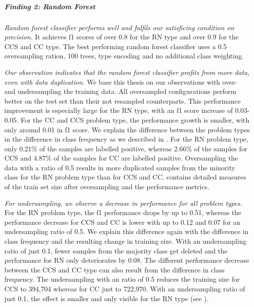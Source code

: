 \subparagraph{Finding 2: Random Forest}
\textit{Random forest classifier performs well and fulfils our satisficing condition on precision.} It achieves f1 scores of over 0.8 for the RN type and over 0.9 for the CCS and CC type.
The best performing random forest classifier uses a 0.5 oversampling ration, 100 trees, type encoding and no additional class weighting.


\textit{Our observation indicates that the random forest classifier profits from more data, even with data duplication.} We base this thesis on our observations with over- and undersampling the training data. 
All oversampled configurations perform better on the test set than their not resampled counterparts. This performance improvement is especially large for the RN type, with an f1 score increase of 0.03-0.05. For the CC and CCS problem type, the performance growth is smaller, with only around 0.01 in f1 score. We explain the difference between the problem types in the difference in class frequency as we described in . For the RN problem type, only 0.21\% of the samples are labelled positive, whereas 2.66\% of the samples for CCS and 4.87\% of the samples for CC are labelled positive. Oversampling the data with a ratio of 0.5 results in more duplicated samples from the minority class for the RN problem type than for CCS and CC.  contains detailed measures of the train set size after oversampling and the performance metrics.

\textit{For undersampling, we observe a decrease in performance for all problem types.} For the RN problem type, the f1 performance drops by up to 0.51, whereas the performance decrease for CCS and CC is lower with up to 0.12 and 0.07 for an undersampling ratio of 0.5. We explain this difference again with the difference in class frequency and the resulting change in training size. With an undersampling ratio of just 0.1, fewer samples from the majority class get deleted and the performance for RN only deteriorates by 0.08.
The different performance decrease between the CCS and CC type can also result from the difference in class frequency. The undersampling with an ratio of 0.5 reduces the training size for CCS to 394,704 whereas for CC just to 722,970. With an undersampling ratio of just 0.1, the effect is smaller and only visible for the RN type (see ).


